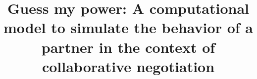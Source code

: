 \documentclass[conference, letterpaper]{IEEEtran}
\begin{document}
	
	\title{Guess my power: A computational model to simulate the behavior of a partner in the context of collaborative negotiation}
	
	
	
	
	
\end{document}
